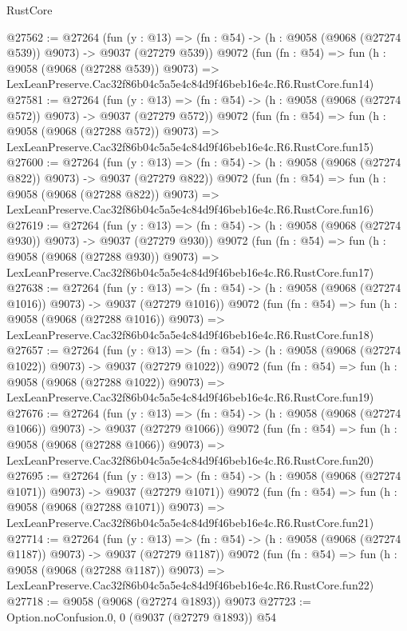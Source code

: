 \begin{lexlean}{RustCore}
\begin{coremodule}
@27562 := @27264
    (fun (y : @13) => (fn : @54) -> (h : @9058 (@9068 (@27274 @539)) @9073) -> @9037 (@27279 @539))
    @9072
    (fun (fn : @54) =>
    fun (h : @9058 (@9068 (@27288 @539)) @9073) =>
    LexLeanPreserve.Cac32f86b04c5a5e4c84d9f46beb16e4c.R6.RustCore.fun14)
@27581 := @27264
    (fun (y : @13) => (fn : @54) -> (h : @9058 (@9068 (@27274 @572)) @9073) -> @9037 (@27279 @572))
    @9072
    (fun (fn : @54) =>
    fun (h : @9058 (@9068 (@27288 @572)) @9073) =>
    LexLeanPreserve.Cac32f86b04c5a5e4c84d9f46beb16e4c.R6.RustCore.fun15)
@27600 := @27264
    (fun (y : @13) => (fn : @54) -> (h : @9058 (@9068 (@27274 @822)) @9073) -> @9037 (@27279 @822))
    @9072
    (fun (fn : @54) =>
    fun (h : @9058 (@9068 (@27288 @822)) @9073) =>
    LexLeanPreserve.Cac32f86b04c5a5e4c84d9f46beb16e4c.R6.RustCore.fun16)
@27619 := @27264
    (fun (y : @13) => (fn : @54) -> (h : @9058 (@9068 (@27274 @930)) @9073) -> @9037 (@27279 @930))
    @9072
    (fun (fn : @54) =>
    fun (h : @9058 (@9068 (@27288 @930)) @9073) =>
    LexLeanPreserve.Cac32f86b04c5a5e4c84d9f46beb16e4c.R6.RustCore.fun17)
@27638 := @27264
    (fun (y : @13) =>
    (fn : @54) -> (h : @9058 (@9068 (@27274 @1016)) @9073) -> @9037 (@27279 @1016))
    @9072
    (fun (fn : @54) =>
    fun (h : @9058 (@9068 (@27288 @1016)) @9073) =>
    LexLeanPreserve.Cac32f86b04c5a5e4c84d9f46beb16e4c.R6.RustCore.fun18)
@27657 := @27264
    (fun (y : @13) =>
    (fn : @54) -> (h : @9058 (@9068 (@27274 @1022)) @9073) -> @9037 (@27279 @1022))
    @9072
    (fun (fn : @54) =>
    fun (h : @9058 (@9068 (@27288 @1022)) @9073) =>
    LexLeanPreserve.Cac32f86b04c5a5e4c84d9f46beb16e4c.R6.RustCore.fun19)
@27676 := @27264
    (fun (y : @13) =>
    (fn : @54) -> (h : @9058 (@9068 (@27274 @1066)) @9073) -> @9037 (@27279 @1066))
    @9072
    (fun (fn : @54) =>
    fun (h : @9058 (@9068 (@27288 @1066)) @9073) =>
    LexLeanPreserve.Cac32f86b04c5a5e4c84d9f46beb16e4c.R6.RustCore.fun20)
@27695 := @27264
    (fun (y : @13) =>
    (fn : @54) -> (h : @9058 (@9068 (@27274 @1071)) @9073) -> @9037 (@27279 @1071))
    @9072
    (fun (fn : @54) =>
    fun (h : @9058 (@9068 (@27288 @1071)) @9073) =>
    LexLeanPreserve.Cac32f86b04c5a5e4c84d9f46beb16e4c.R6.RustCore.fun21)
@27714 := @27264
    (fun (y : @13) =>
    (fn : @54) -> (h : @9058 (@9068 (@27274 @1187)) @9073) -> @9037 (@27279 @1187))
    @9072
    (fun (fn : @54) =>
    fun (h : @9058 (@9068 (@27288 @1187)) @9073) =>
    LexLeanPreserve.Cac32f86b04c5a5e4c84d9f46beb16e4c.R6.RustCore.fun22)
@27718 := @9058 (@9068 (@27274 @1893)) @9073
@27723 := Option.noConfusion.{0, 0} (@9037 (@27279 @1893)) @54

\end{coremodule}
\end{lexlean}
